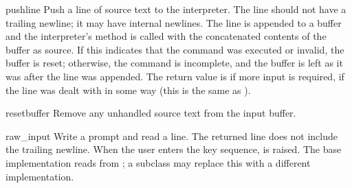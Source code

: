 \begin{methoddesc}{push}{line}
Push a line of source text to the interpreter.
The line should not have a trailing newline; it may have internal
newlines.  The line is appended to a buffer and the interpreter's
 method is called with the concatenated contents
of the buffer as source.  If this indicates that the command was
executed or invalid, the buffer is reset; otherwise, the command is
incomplete, and the buffer is left as it was after the line was
appended.  The return value is  if more input is required,
 if the line was dealt with in some way (this is the same as
).
\end{methoddesc}

\begin{methoddesc}{resetbuffer}{}
Remove any unhandled source text from the input buffer.
\end{methoddesc}

\begin{methoddesc}{raw_input}{}
Write a prompt and read a line.  The returned line does not include
the trailing newline.  When the user enters the \EOF{} key sequence,
 is raised.  The base implementation reads from
; a subclass may replace this
with a different implementation.
\end{methoddesc}
